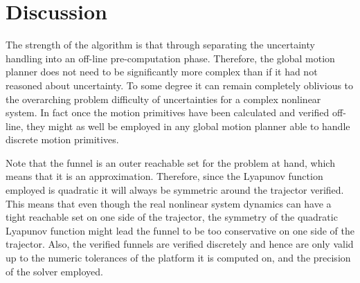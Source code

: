 \chapter{Discussion}
\label{chp:discussion}

The strength of the algorithm is that through separating the uncertainty
handling into an off-line pre-computation phase. Therefore, the global motion
planner does not need to be significantly more complex than if it had not
reasoned about uncertainty. To some degree it can remain completely oblivious to
the overarching problem difficulty of uncertainties for a complex nonlinear
system. In fact once the motion primitives have been calculated and verified
off-line, they might as well be employed in any global motion planner able to
handle discrete motion primitives.


Note that the funnel is an outer reachable set for the problem at hand, which
means that it is an approximation. Therefore, since the Lyapunov function
employed is quadratic it will always be symmetric around the trajector verified.
This means that even though the real nonlinear system dynamics can have a tight
reachable set on one side of the trajector, the symmetry of the quadratic
Lyapunov function might lead the funnel to be too conservative on one side of
the trajector. Also, the verified funnels are verified discretely and hence are
only valid up to the numeric tolerances of the platform it is computed on, and
the precision of the solver employed.


